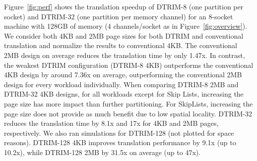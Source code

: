 Figure~\ref{fig:perf} shows the translation speedup of DTRIM-8 (one partition per socket) and DTRIM-32 (one partition per memory channel) for an 8-socket machine with 128GB of memory (4 channels/socket as in Figure~\ref{fig:overview}). We consider both 4KB and 2MB page sizes for both DTRIM and conventional translation and normalize the results to conventional $4$KB. The conventional 2MB design on average reduces the translation time by only 1.47x. In contrast, the weakest DTRIM configuration (DTRIM-8 4KB) outperforms the conventional $4$KB design by around 7.36x on average, outperforming the conventional 2MB design for every workload individually. When comparing DTRIM-8 2MB and DTRIM-32 4KB designs, for all workloads except for Skip Lists, increasing the page size has more impact than further partitioning. For SkipLists, increasing the page size does not provide as much benefit due to low spatial locality. DTRIM-32 reduces the translation time by 8.1x and 17x for 4KB and 2MB pages, respectively. We also ran simulations for DTRIM-128 (not plotted for space reasons). DTRIM-128 4KB improves translation performance by 9.1x (up to 10.2x), while  DTRIM-128 2MB by 31.5x on average (up to 47x).
